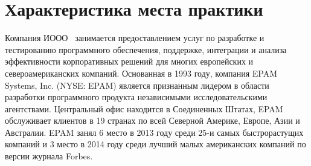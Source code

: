 \section{Характеристика места практики}
\label{sec:practice:itechart_characteristics}

Компания ИООО~\company{} занимается предоставлением услуг по разработке и тестированию программного обеспечения, поддержке, интеграции и анализа эффективности корпоративных решений для многих европейских и североамериканских компаний.
Основанная в 1993 году, компания EPAM Systems, Inc. (NYSE: EPAM) является признанным лидером в области разработки программного продукта независимыми исследовательскими агентствами. Центральный офис находится в Соединенных Штатах, EPAM обслуживает клиентов в 19 странах по всей Северной Америке, Европе, Азии и Австралии.
EPAM занял 6 место в 2013 году среди 25-и самых быстрорастущих компаний и 3 место в 2014 году среди лучший малых американских компаний по версии журнала Forbes.

